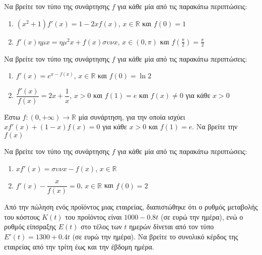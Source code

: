 \documentclass{presentation}
\begin{document}
\begin{askisi}
    Να βρείτε τον τύπο της συνάρτησης $f$ για κάθε μία από τις παρακάτω περιπτώσεις:
    \begin{enumerate}[<+->]
        \item $(x^2+1)f'(x)=1-2xf(x)$, $x\in\mathbb{R}$ και $f(0)=1$
        \item $f'(x)ημx=ημ^2x+f(x)συνx$, $x\in \left( 0,π \right) $ και $f(\frac{π}{2})=\frac{π}{2}$
    \end{enumerate}
\end{askisi}

\begin{askisi}
    Να βρείτε τον τύπο της συνάρτησης $f$ για κάθε μία από τις παρακάτω περιπτώσεις:
    \begin{enumerate}[<+->]
        \item $f'(x)=e^{x-f(x)}$, $x\in\mathbb{R}$ και $f(0)=\ln 2$
        \item $\dfrac{f'(x)}{f(x)}=2x+\dfrac{1}{x}$, $x>0$ και $f(1)=e$ και $f(x)\ne 0$ για κάθε $x>0$
    \end{enumerate}
\end{askisi}

\begin{askisi}
    Έστω $f:(0,+\infty)\to\mathbb{R}$ μία συνάρτηση, για την οποία ισχύει $xf'(x)+(1-x)f(x)=0$ για κάθε $x>0$ και $f(1)=e$. Να βρείτε την $f(x)$
\end{askisi}

\begin{askisi}
    Να βρείτε τον τύπο της συνάρτησης $f$ για κάθε μία από τις παρακάτω περιπτώσεις:
    \begin{enumerate}[<+->]
        \item $xf'(x)=συνx-f(x)$, $x\in\mathbb{R}$
        \item $f'(x)-\dfrac{x}{f(x)}=0$, $x\in\mathbb{R}$ και $f(0)=2$
    \end{enumerate}
\end{askisi}

\begin{askisi}
    Από την πώληση ενός προϊόντος μιας εταιρείας, διαπιστώθηκε ότι ο ρυθμός μεταβολής του κόστους $Κ(t)$ του προϊόντος είναι $1000-0.8t$ (σε ευρώ την ημέρα), ενώ ο ρυθμός είπσραξης $Ε(t)$ στο τέλος των $t$ ημερών δίνεται από τον τύπο $Ε'(t)=1300+0.4t$ (σε ευρώ την ημέρα). Να βρείτε το συνολικό κέρδος της εταιρείας από την τρίτη έως και την έβδομη ημέρα.
\end{askisi}
\end{document}
